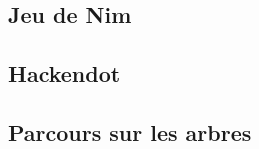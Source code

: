 \subsection{Jeu de Nim}
    \label{sub:Jeu de Nim}

    \subsection{Hackendot}
    \label{sub:Hackendot}

    \subsection{Parcours sur les arbres}
    \label{sub:Parcours sur les arbres}